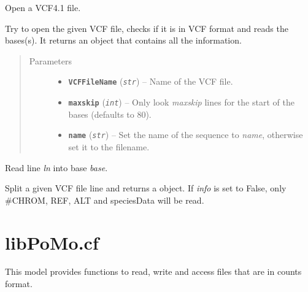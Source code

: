 \documentclass[letterpaper,10pt,english]{sphinxmanual}
\begin{document}
\begin{fulllineitems}
\label{vcf:libPoMo.vcf.open_seq}
Open a VCF4.1 file.

Try to open the given VCF file, checks if it is in VCF format and
reads the bases(s).  It returns an {\hyperref[vcf:libPoMo.vcf.VCFSeq]{}} object that
contains all the information.
\begin{quote}\begin{description}
\item[{Parameters}] \leavevmode\begin{itemize}
\item {} 
\textbf{\texttt{VCFFileName}} (\emph{\texttt{str}}) -- Name of the VCF file.

\item {} 
\textbf{\texttt{maxskip}} (\emph{\texttt{int}}) -- Only look \emph{maxskip} lines for the start of the
bases (defaults to 80).

\item {} 
\textbf{\texttt{name}} (\emph{\texttt{str}}) -- Set the name of the sequence to \emph{name}, otherwise
set it to the filename.

\end{itemize}

\end{description}\end{quote}

\end{fulllineitems}


\begin{fulllineitems}
\label{vcf:libPoMo.vcf.update_base}
Read line \emph{ln} into base \emph{base}.

Split a given VCF file line and returns a {\hyperref[vcf:libPoMo.vcf.NucBase]{}}
object. If \emph{info} is set to False, only \#CHROM, REF, ALT and
speciesData will be read.

\end{fulllineitems}

\label{cf:module-libPoMo.cf}

\section{libPoMo.cf}
\label{cf::doc}\label{cf:libpomo-cf}
This model provides functions to read, write and access files that are
in counts format.
\end{document}
